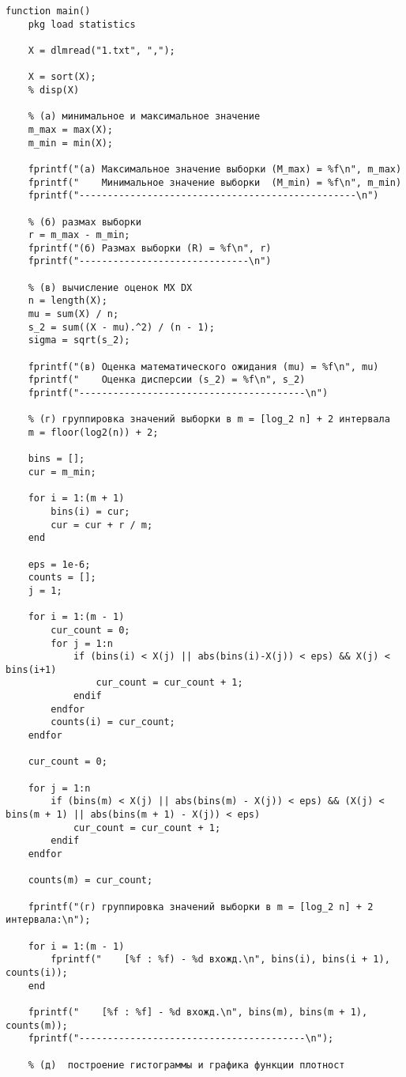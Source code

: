 \begin{lstlisting}
function main()
	pkg load statistics
	
	X = dlmread("1.txt", ",");
	
	X = sort(X);
	% disp(X)
	
	% (a) минимальное и максимальное значение
	m_max = max(X);
	m_min = min(X);
	
	fprintf("(a) Максимальное значение выборки (M_max) = %f\n", m_max)
	fprintf("    Минимальное значение выборки  (M_min) = %f\n", m_min)
	fprintf("-------------------------------------------------\n")
	
	% (б) размах выборки
	r = m_max - m_min;
	fprintf("(б) Размах выборки (R) = %f\n", r)
	fprintf("------------------------------\n")
	
	% (в) вычисление оценок MX DX
	n = length(X);
	mu = sum(X) / n;
	s_2 = sum((X - mu).^2) / (n - 1);
	sigma = sqrt(s_2);
	
	fprintf("(в) Оценка математического ожидания (mu) = %f\n", mu)
	fprintf("    Оценка дисперсии (s_2) = %f\n", s_2)
	fprintf("----------------------------------------\n")
	
	% (г) группировка значений выборки в m = [log_2 n] + 2 интервала
	m = floor(log2(n)) + 2;
	
	bins = [];
	cur = m_min;
	
	for i = 1:(m + 1)
		bins(i) = cur;
		cur = cur + r / m;
	end
	
	eps = 1e-6;
	counts = [];
	j = 1;
	
	for i = 1:(m - 1)
		cur_count = 0;
		for j = 1:n
			if (bins(i) < X(j) || abs(bins(i)-X(j)) < eps) && X(j) < bins(i+1)
				cur_count = cur_count + 1;
			endif
		endfor
		counts(i) = cur_count;
	endfor
	
	cur_count = 0;
	
	for j = 1:n
		if (bins(m) < X(j) || abs(bins(m) - X(j)) < eps) && (X(j) < bins(m + 1) || abs(bins(m + 1) - X(j)) < eps)
			cur_count = cur_count + 1;
		endif
	endfor
	
	counts(m) = cur_count;
	
	fprintf("(г) группировка значений выборки в m = [log_2 n] + 2 интервала:\n");
	
	for i = 1:(m - 1)
		fprintf("    [%f : %f) - %d вхожд.\n", bins(i), bins(i + 1), counts(i));
	end
	
	fprintf("    [%f : %f] - %d вхожд.\n", bins(m), bins(m + 1), counts(m));
	fprintf("----------------------------------------\n");
	
	% (д)  построение гистограммы и графика функции плотност
	

\end{lstlisting}
